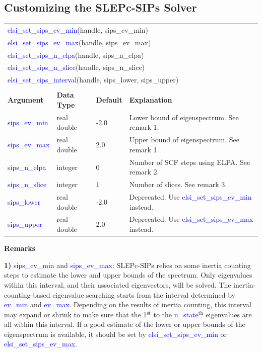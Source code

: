 \documentclass{report}
\newcommand{\tcb}[1]{\textcolor{blue}{#1}}
\begin{document}
\subsection{Customizing the SLEPc-SIPs Solver}
\label{subsec:setter_sips}
\begin{tabular}[]{|p{30mm}|p{20mm}|p{15mm}|p{100mm}|}
\multicolumn{4}{l}{\tcb{elsi\_set\_sips\_ev\_min}(handle, sips\_ev\_min)}\\
\multicolumn{4}{l}{\tcb{elsi\_set\_sips\_ev\_max}(handle, sips\_ev\_max)}\\
\multicolumn{4}{l}{\tcb{elsi\_set\_sips\_n\_elpa}(handle, sips\_n\_elpa)}\\
\multicolumn{4}{l}{\tcb{elsi\_set\_sips\_n\_slice}(handle, sips\_n\_slice)}\\
\multicolumn{4}{l}{\tcb{elsi\_set\_sips\_interval}(handle, sips\_lower, sips\_upper)}\\
\multicolumn{4}{l}{}\\
\hline
\multicolumn{1}{|l|}{\textbf{Argument}} & \multicolumn{1}{l|}{\textbf{Data Type}} & \multicolumn{1}{l|}{\textbf{Default}} & \multicolumn{1}{l|}{\textbf{Explanation}}\\
\hline
\tcb{sips\_ev\_min}  & real double & -2.0 & Lower bound of eigenspectrum. See remark 1.\\
\hline
\tcb{sips\_ev\_max}  & real double & 2.0  & Upper bound of eigenspectrum. See remark 1.\\
\hline
\tcb{sips\_n\_elpa}  & integer     & 0    & Number of SCF steps using ELPA. See remark 2.\\
\hline
\tcb{sips\_n\_slice} & integer     & 1    & Number of slices. See remark 3.\\
\hline
\tcb{sips\_lower}    & real double & -2.0 & Deprecated. Use \tcb{elsi\_set\_sips\_ev\_min} instead.\\
\hline
\tcb{sips\_upper}    & real double & 2.0  & Deprecated. Use \tcb{elsi\_set\_sips\_ev\_max} instead.\\
\hline
\end{tabular}

\newpage
\textbf{Remarks}

\textbf{1)} \tcb{sips\_ev\_min} and \tcb{sips\_ev\_max}: SLEPc-SIPs relies on some inertia counting steps to estimate the lower and upper bounds of the spectrum. Only eigenvalues within this interval, and their associated eigenvectors, will be solved. The inertia-counting-based eigenvalue searching starts from the interval determined by \tcb{ev\_min} and \tcb{ev\_max}. Depending on the results of inertia counting, this interval may expand or shrink to make sure that the 1$^\text{st}$ to the \tcb{n\_state}$^\text{th}$ eigenvalues are all within this interval. If a good estimate of the lower or upper bounds of the eigenspectrum is available, it should be set by \tcb{elsi\_set\_sips\_ev\_min} or \tcb{elsi\_set\_sips\_ev\_max}.
\end{document}
